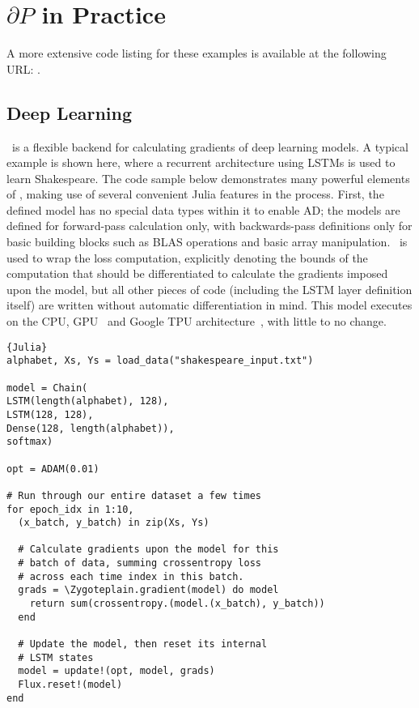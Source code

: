 \documentclass{juliacon}
\newcommand{\Zygote}{\iftoggle{anonymous}{$\partial$P.jl}{Zygote}}
\newcommand{\Zygoteplain}{\iftoggle{anonymous}{$\partial$P.jl}{Zygote}}
\begin{document}
\section{$\partial P$ in Practice}

A more extensive code listing for these examples is available at the following URL: \iftoggle{anonymous}{Hidden for review - an anonymized version is included as supplemental material}{https://github.com/MikeInnes/zygote-paper}.

\subsection{Deep Learning}
\label{dl}

\Zygote\ is a flexible backend for calculating gradients of deep learning models. A typical example is shown here, where a recurrent architecture using LSTMs \cite{Hochreiter:1997:lstm} is used to learn Shakespeare.
The code sample below demonstrates many powerful elements of \Zygote, making use of several convenient Julia features in the process.  First, the defined model has no special data types within it to enable AD; the models are defined for forward-pass calculation only, with backwards-pass definitions only for basic building blocks such as BLAS operations and basic array manipulation. \Zygote\ is used to wrap the loss computation, explicitly denoting the bounds of the computation that should be differentiated to calculate the gradients imposed upon the model, but all other pieces of code (including the LSTM layer definition itself) are written without automatic differentiation in mind. This model executes on the CPU, GPU~\cite{Flux.jl-2018} and Google TPU architecture~\cite{XLA.jl-2018}, with little to no change.

\begin{lstlisting}{Julia}
alphabet, Xs, Ys = load_data("shakespeare_input.txt")

model = Chain(
LSTM(length(alphabet), 128),
LSTM(128, 128),
Dense(128, length(alphabet)),
softmax)

opt = ADAM(0.01)

# Run through our entire dataset a few times
for epoch_idx in 1:10,
  (x_batch, y_batch) in zip(Xs, Ys)
  
  # Calculate gradients upon the model for this
  # batch of data, summing crossentropy loss
  # across each time index in this batch.
  grads = \Zygoteplain.gradient(model) do model
    return sum(crossentropy.(model.(x_batch), y_batch))
  end
  
  # Update the model, then reset its internal
  # LSTM states
  model = update!(opt, model, grads)
  Flux.reset!(model)
end
\end{lstlisting}
\end{document}
